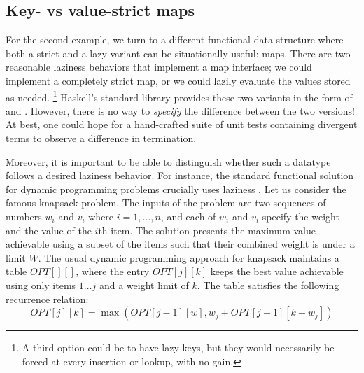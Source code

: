 \documentclass[acmsmall,review]{acmart}\settopmatter{}
\begin{document}
\subsection{Key- vs value-strict maps}


For the second example, we turn to a different functional data structure where
both a strict and a lazy variant can be situationally useful: maps. There are
two reasonable laziness behaviors that implement a map interface; we could
implement a completely strict map, or we could lazily evaluate the values stored
as needed.
\footnote{A third option could be to have lazy keys, but they would
necessarily be forced at every insertion or lookup, with no gain.}
Haskell's standard library provides these two variants in the form of
 and . However, there is no way
to {\em specify} the difference between the two versions! At best, one
could hope for a hand-crafted suite of unit tests containing divergent
terms to observe a difference in termination.


Moreover, it is important to be able to distinguish whether such a datatype
follows a desired laziness behavior. For instance, the standard functional
solution for dynamic programming problems crucially uses laziness . Let us consider the famous knapsack problem.
%
The inputs of the problem are two sequences of numbers $w_i$ and $v_i$
where $i = 1, \dots, n$, and each of $w_i$ and $v_i$ specify the
weight and the value of the $i$th item. The solution presents the
maximum value achievable using a subset of the items such that their
combined weight is under a limit $W$.
%
The usual dynamic programming approach for knapsack maintains a
table $OPT[][]$, where the entry $OPT[j][k]$ keeps the best value
achievable using only items $1\dots j$ and a weight limit of $k$. The
table satisfies the following recurrence relation: $$OPT[j][k]
= \max(OPT[j-1][w], w_j + OPT[j-1][k-w_j])$$
\end{document}
